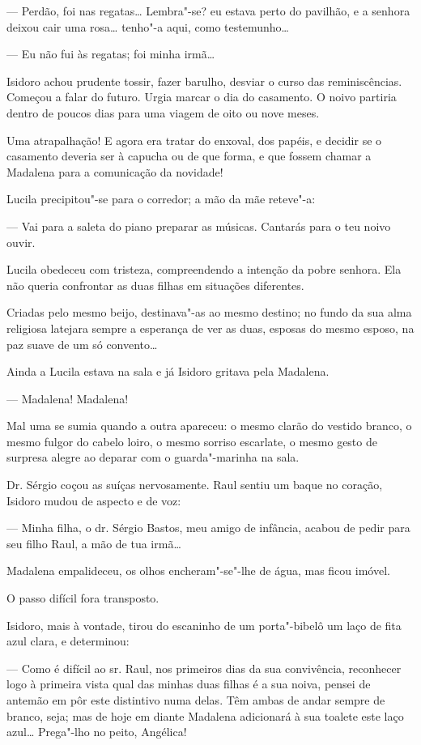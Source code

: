 --- Perdão, foi nas regatas\ldots{} Lembra"-se? eu estava perto do pavilhão, e
a senhora deixou cair uma rosa\ldots{} tenho"-a aqui, como testemunho\ldots{}

--- Eu não fui às regatas; foi minha irmã\ldots{}

Isidoro achou prudente tossir, fazer barulho, desviar o curso das
reminiscências. Começou a falar do futuro. Urgia marcar o dia do
casamento. O noivo partiria dentro de poucos dias para uma viagem de
oito ou nove meses.

Uma atrapalhação! E agora era tratar do enxoval, dos papéis, e decidir
se o casamento deveria ser à capucha ou de que forma, e que fossem
chamar a Madalena para a comunicação da novidade!

Lucila precipitou"-se para o corredor; a mão da mãe reteve"-a:

--- Vai para a saleta do piano preparar as músicas. Cantarás para o teu
noivo ouvir.

Lucila obedeceu com tristeza, compreendendo a intenção da pobre senhora.
Ela não queria confrontar as duas filhas em situações diferentes.

Criadas pelo mesmo beijo, destinava"-as ao mesmo destino; no fundo da sua
alma religiosa latejara sempre a esperança de ver as duas, esposas do
mesmo esposo, na paz suave de um só convento\ldots{}

Ainda a Lucila estava na sala e já Isidoro gritava pela Madalena.

--- Madalena! Madalena!

Mal uma se sumia quando a outra apareceu: o mesmo clarão do vestido
branco, o mesmo fulgor do cabelo loiro, o mesmo sorriso escarlate, o
mesmo gesto de surpresa alegre ao deparar com o guarda"-marinha na sala.

Dr. Sérgio coçou as suíças nervosamente. Raul sentiu um baque no
coração, Isidoro mudou de aspecto e de voz:

--- Minha filha, o dr. Sérgio Bastos, meu amigo de infância, acabou de
pedir para seu filho Raul, a mão de tua irmã\ldots{}

Madalena empalideceu, os olhos encheram"-se"-lhe de água, mas ficou
imóvel.

O passo difícil fora transposto.

Isidoro, mais à vontade, tirou do escaninho de um porta"-bibelô um laço
de fita azul clara, e determinou:

--- Como é difícil ao sr. Raul, nos primeiros dias da sua convivência,
reconhecer logo à primeira vista qual das minhas duas filhas é a sua
noiva, pensei de antemão em pôr este distintivo numa delas. Têm ambas de
andar sempre de branco, seja; mas de hoje em diante Madalena adicionará
à sua toalete este laço azul\ldots{} Prega"-lho no peito, Angélica!

